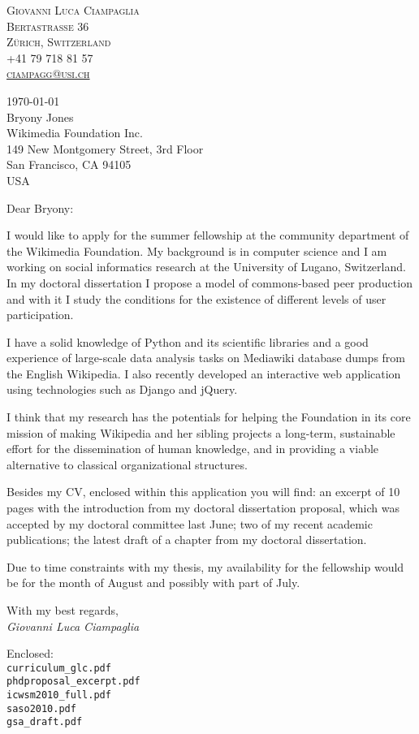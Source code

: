 \documentclass[10pt, a4paper]{article}
\begin{document}
\center
\textsc{Giovanni Luca Ciampaglia\\
Bertastraße 36\\
 Zürich, Switzerland\\
+41 79 718 81 57\\
\href{mailto:ciampagg@usi.ch}{ciampagg@usi.ch}
}

\raggedright
\vspace{0.5in}
\today\\[2em]

Bryony Jones\\
Wikimedia Foundation Inc.\\
149 New Montgomery Street, 3rd Floor\\
San Francisco, CA 94105\\
USA\\
\vspace{2em}

Dear Bryony:

I would like to apply for the summer fellowship at the community department of
the Wikimedia Foundation. My background is in computer science and I am working
on social informatics research at the University of Lugano, Switzerland. In my
doctoral dissertation I propose a model of commons-based peer production and
with it I study the conditions for the existence of different levels of user
participation.

I have a solid knowledge of Python and its scientific libraries and a good
experience of large-scale data analysis tasks on Mediawiki database dumps from
the English Wikipedia. I also recently developed an interactive web application
using technologies such as Django and jQuery.

I think that my research has the potentials for helping the Foundation in its
core mission of making Wikipedia and her sibling projects a long-term,
sustainable effort for the dissemination of human knowledge, and in providing a
viable alternative to classical organizational structures.

Besides my CV, enclosed within this application you will find: an excerpt of 10
pages with the introduction from my doctoral dissertation proposal, which was
accepted by my doctoral committee last June; two of my recent academic
publications; the latest draft of a chapter from my doctoral dissertation.

Due to time constraints with my thesis, my availability for the fellowship
would be for the month of August and possibly with part of July.

\vspace{2em}
\raggedleft
With my best regards,\\
\emph{Giovanni Luca Ciampaglia}\\[1em]
\vfill
\raggedright
Enclosed:\\[.1cm]
\footnotesize
\texttt{curriculum\_glc.pdf}\\
\texttt{phdproposal\_excerpt.pdf}\\
\texttt{icwsm2010\_full.pdf}\\
\texttt{saso2010.pdf}\\ 
\texttt{gsa\_draft.pdf}
\end{document}
